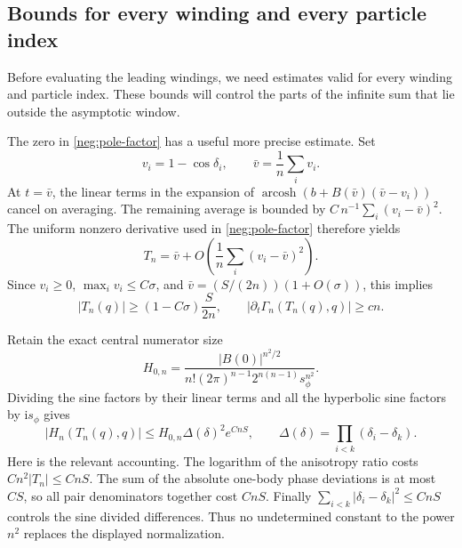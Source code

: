 \documentclass[11pt]{article}
\numberwithin{equation}{section}
\theoremstyle{definition}
\newcommand{\ii}{\mathrm i}
\begin{document}
\subsection{Bounds for every winding and every particle index}
\label{neg:all-windings}

Before evaluating the leading windings, we need estimates valid for
every winding and particle index. These bounds will control the
parts of the infinite sum that lie outside the asymptotic window.

The zero in \eqref{neg:pole-factor} has a useful more precise
estimate.  Set
\[
 v_i=1-\cos\delta_i,\qquad \bar v=\frac1n\sum_i v_i .
 \]
At \(t=\bar v\), the linear terms in the expansion of
\(\operatorname{arcosh}(b+B(\bar v)(\bar v-v_i))\) cancel on
averaging.  The remaining average is bounded by
\(C\,n^{-1}\sum_i(v_i-\bar v)^2\).  The uniform nonzero
derivative used in \eqref{neg:pole-factor} therefore yields
\[
 T_n=\bar v+
       O\!\left(\frac1n\sum_i(v_i-\bar v)^2\right).
 \]
Since \(v_i\ge0\), \(\max_i v_i\le C\sigma\), and
\(\bar v=(S/(2n))(1+O(\sigma))\), this implies
\begin{equation}
 |T_n(q)|\ge(1-C\sigma)\frac{S}{2n},
 \qquad
 |\partial_t\Gamma_n(T_n(q),q)|\ge cn .
 \label{neg:pole-lower}
\end{equation}

Retain the exact central numerator size
\begin{equation}
 H_{0,n}=
 \frac{|B(0)|^{n^2/2}}
 {n!(2\pi)^{n-1}2^{n(n-1)}s_\phi^{n^2}} .
 \label{neg:H0}
\end{equation}
Dividing the sine factors by their linear terms and all the
hyperbolic sine factors by \(\ii s_\phi\) gives
\begin{equation}
 |H_n(T_n(q),q)|
 \le H_{0,n}\Delta(\delta)^2e^{CnS},
 \qquad
 \Delta(\delta)=\prod_{i<k}(\delta_i-\delta_k).
 \label{neg:pole-density-upper}
\end{equation}
Here is the relevant accounting.  The logarithm of the anisotropy
ratio costs \(Cn^2|T_n|\le CnS\).  The sum of the absolute
one-body phase deviations is at most \(CS\), so all pair
denominators together cost \(CnS\).  Finally
\(\sum_{i<k}|\delta_i-\delta_k|^2\le CnS\) controls the sine
divided differences.  Thus no undetermined constant to the power
\(n^2\) replaces the displayed normalization.
\end{document}
